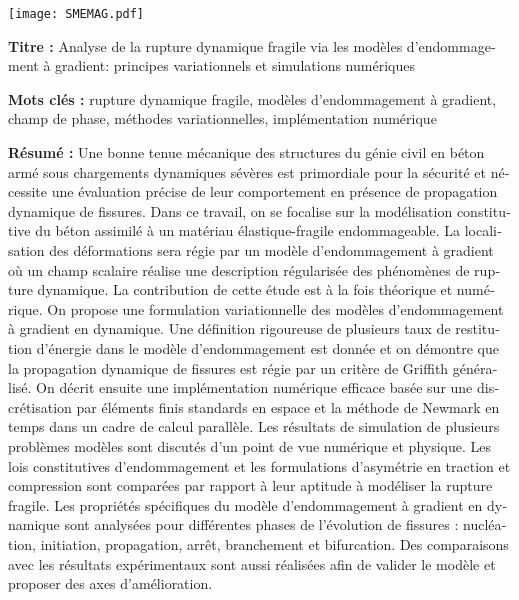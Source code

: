 \pagestyle{empty}

\begin{flushleft}
\texttt{[image: SMEMAG.pdf]}

\vspace{20pt}

\begin{mdframed}
\begin{otherlanguage}{french}
\textbf{Titre :} Analyse de la rupture dynamique fragile via les modèles d'endommagement à gradient: principes variationnels et simulations numériques

\textbf{Mots clés :} rupture dynamique fragile, modèles d'endommagement à gradient, champ de phase, méthodes variationnelles, implémentation numérique

\textbf{Résumé :} Une bonne tenue mécanique des structures du génie civil en béton armé sous chargements dynamiques sévères est primordiale pour la sécurité et nécessite une évaluation précise de leur comportement en présence de propagation dynamique de fissures. Dans ce travail, on se focalise sur la modélisation constitutive du béton assimilé à un matériau élastique-fragile endommageable. La localisation des déformations sera régie par un modèle d'endommagement à gradient où un champ scalaire réalise une description régularisée des phénomènes de rupture dynamique. La contribution de cette étude est à la fois théorique et numérique. On propose une formulation variationnelle des modèles d'endommagement à gradient en dynamique. Une définition rigoureuse de plusieurs taux de restitution d'énergie dans le modèle d'endommagement est donnée et on démontre que la propagation dynamique de fissures est régie par un critère de Griffith généralisé. On décrit ensuite une implémentation numérique efficace basée sur une discrétisation par éléments finis standards en espace et la méthode de Newmark en temps dans un cadre de calcul parallèle. Les résultats de simulation de plusieurs problèmes modèles sont discutés d'un point de vue numérique et physique. Les lois constitutives d'endommagement et les formulations d'asymétrie en traction et compression sont comparées par rapport à leur aptitude à modéliser la rupture fragile. Les propriétés spécifiques du modèle d'endommagement à gradient en dynamique sont analysées pour différentes phases de l'évolution de fissures : nucléation, initiation, propagation, arrêt, branchement et bifurcation. Des comparaisons avec les résultats expérimentaux sont aussi réalisées afin de valider le modèle et proposer des axes d'amélioration.
\end{otherlanguage}
\end{mdframed}


\end{flushleft}
